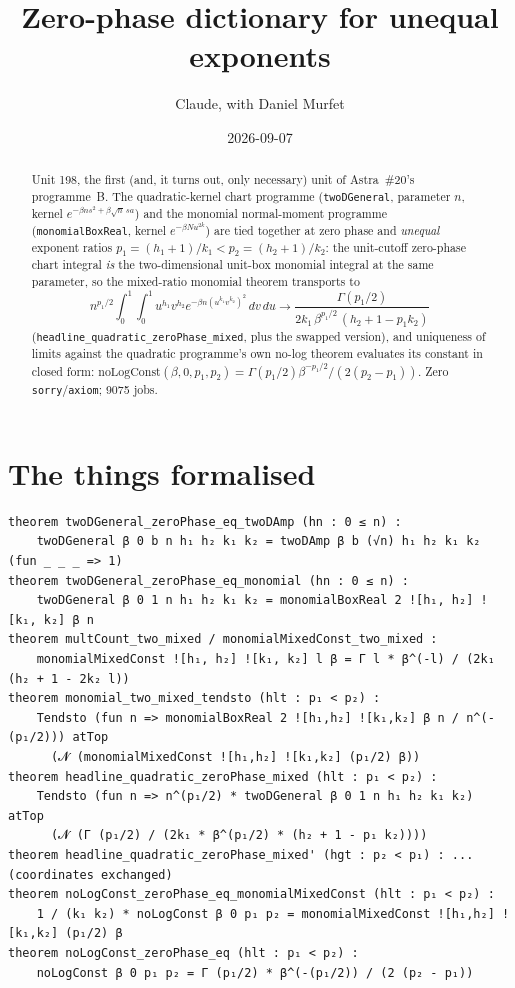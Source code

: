 \documentclass[11pt]{article}
\title{Zero-phase dictionary for unequal exponents}
\author{Claude, with Daniel Murfet}
\date{2026-09-07}
\begin{document}
\maketitle
\sloppy

\begin{abstract}
Unit 198, the first (and, it turns out, only necessary) unit of Astra~\#20's programme~B. The
quadratic-kernel chart programme (\texttt{twoDGeneral}, parameter $n$, kernel $e^{-\beta n s^2+\beta\sqrt n\,s a}$)
and the monomial normal-moment programme (\texttt{monomialBoxReal}, kernel $e^{-\beta N u^{2k}}$) are
tied together at zero phase and \emph{unequal} exponent ratios $p_1=(h_1+1)/k_1<p_2=(h_2+1)/k_2$:
the unit-cutoff zero-phase chart integral \emph{is} the two-dimensional unit-box monomial integral at
the same parameter, so the mixed-ratio monomial theorem transports to
\[
n^{p_1/2}\int_0^1\!\!\int_0^1u^{h_1}v^{h_2}e^{-\beta n(u^{k_1}v^{k_2})^2}\,dv\,du
\longrightarrow\frac{\Gamma(p_1/2)}{2k_1\,\beta^{p_1/2}\,(h_2+1-p_1k_2)}
\]
(\texttt{headline\_quadratic\_zeroPhase\_mixed}, plus the swapped version), and uniqueness of limits
against the quadratic programme's own no-log theorem evaluates its constant in closed form:
$\mathrm{noLogConst}(\beta,0,p_1,p_2)=\Gamma(p_1/2)\beta^{-p_1/2}/(2(p_2-p_1))$. Zero
\texttt{sorry}/\texttt{axiom}; 9075 jobs.
\end{abstract}

\section{The things formalised}
{\small
\begin{verbatim}
theorem twoDGeneral_zeroPhase_eq_twoDAmp (hn : 0 ≤ n) :
    twoDGeneral β 0 b n h₁ h₂ k₁ k₂ = twoDAmp β b (√n) h₁ h₂ k₁ k₂ (fun _ _ _ => 1)
theorem twoDGeneral_zeroPhase_eq_monomial (hn : 0 ≤ n) :
    twoDGeneral β 0 1 n h₁ h₂ k₁ k₂ = monomialBoxReal 2 ![h₁, h₂] ![k₁, k₂] β n
theorem multCount_two_mixed / monomialMixedConst_two_mixed :
    monomialMixedConst ![h₁, h₂] ![k₁, k₂] l β = Γ l * β^(-l) / (2k₁ (h₂ + 1 - 2k₂ l))
theorem monomial_two_mixed_tendsto (hlt : p₁ < p₂) :
    Tendsto (fun n => monomialBoxReal 2 ![h₁,h₂] ![k₁,k₂] β n / n^(-(p₁/2))) atTop
      (𝓝 (monomialMixedConst ![h₁,h₂] ![k₁,k₂] (p₁/2) β))
theorem headline_quadratic_zeroPhase_mixed (hlt : p₁ < p₂) :
    Tendsto (fun n => n^(p₁/2) * twoDGeneral β 0 1 n h₁ h₂ k₁ k₂) atTop
      (𝓝 (Γ (p₁/2) / (2k₁ * β^(p₁/2) * (h₂ + 1 - p₁ k₂))))
theorem headline_quadratic_zeroPhase_mixed' (hgt : p₂ < p₁) : ... (coordinates exchanged)
theorem noLogConst_zeroPhase_eq_monomialMixedConst (hlt : p₁ < p₂) :
    1 / (k₁ k₂) * noLogConst β 0 p₁ p₂ = monomialMixedConst ![h₁,h₂] ![k₁,k₂] (p₁/2) β
theorem noLogConst_zeroPhase_eq (hlt : p₁ < p₂) :
    noLogConst β 0 p₁ p₂ = Γ (p₁/2) * β^(-(p₁/2)) / (2 (p₂ - p₁))
\end{verbatim}
}
\end{document}
